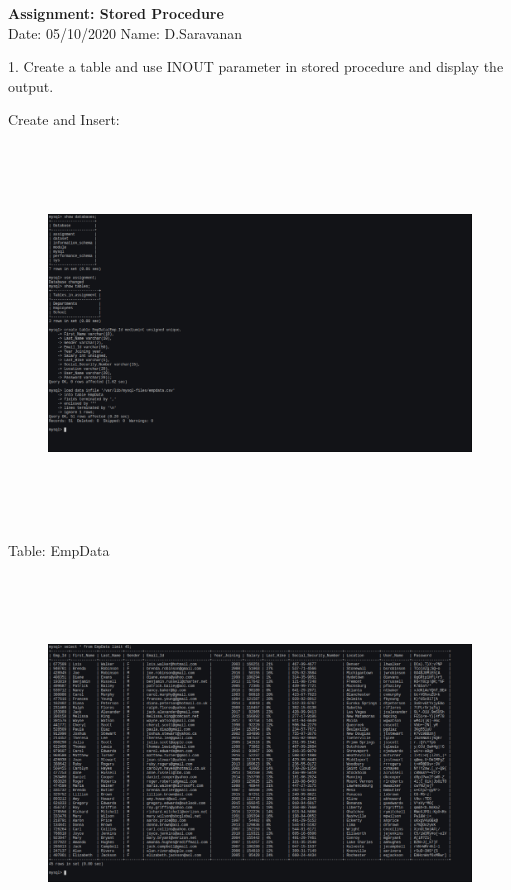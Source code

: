 \documentclass[a4paper,11pt,openright]{report}
\begin{document}
\singlespacing
\pagestyle{plain}

\begin{small}
\begin{center}
\textbf{Assignment: Stored Procedure} \\
Date: 05/10/2020 \hspace{2mm} Name: D.Saravanan
\end{center}
\end{small}

\vspace{10px}

\begin{footnotesize}
1. Create a table and use INOUT parameter in stored procedure and display the output.
\end{footnotesize}

{\footnotesize Create and Insert:}
\begin{figure}[ht!]
\includegraphics[width=20cm,height=10cm,keepaspectratio]{image1.pdf}
\centering
\end{figure}

{\footnotesize Table: EmpData}
\begin{figure}[ht!]
\includegraphics[width=20cm,height=10cm,keepaspectratio]{image2.pdf}
\centering
\end{figure}
\end{document}
